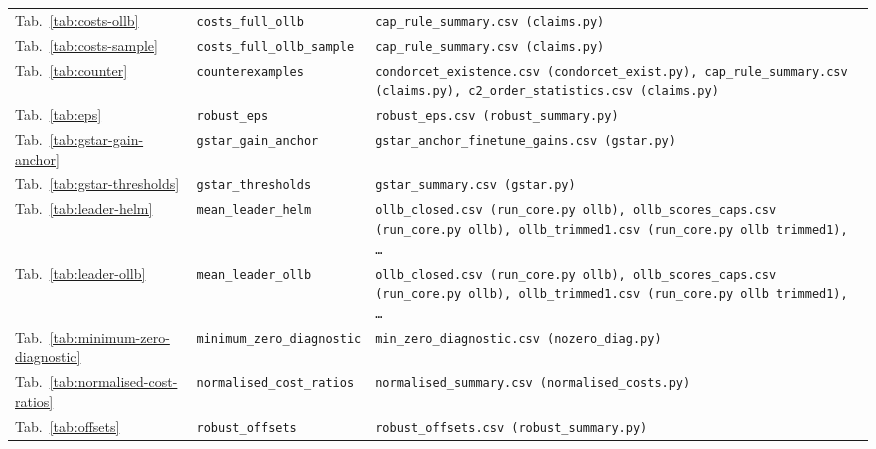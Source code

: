 \begin{longtable}{@{}p{0.55in} p{1.55in} p{3.0in}@{}}
Tab.~\ref{tab:costs-ollb} & \texttt{costs\_\allowbreak full\_\allowbreak ollb} & \texttt{cap\_\allowbreak rule\_\allowbreak summary.csv (claims.py)} \\
Tab.~\ref{tab:costs-sample} & \texttt{costs\_\allowbreak full\_\allowbreak ollb\_\allowbreak sample} & \texttt{cap\_\allowbreak rule\_\allowbreak summary.csv (claims.py)} \\
Tab.~\ref{tab:counter} & \texttt{counterexamples} & \texttt{condorcet\_\allowbreak existence.csv (condorcet\_\allowbreak exist.py), cap\_\allowbreak rule\_\allowbreak summary.csv (claims.py), c2\_\allowbreak order\_\allowbreak statistics.csv (claims.py)} \\
Tab.~\ref{tab:eps} & \texttt{robust\_\allowbreak eps} & \texttt{robust\_\allowbreak eps.csv (robust\_\allowbreak summary.py)} \\
Tab.~\ref{tab:gstar-gain-anchor} & \texttt{gstar\_\allowbreak gain\_\allowbreak anchor} & \texttt{gstar\_\allowbreak anchor\_\allowbreak finetune\_\allowbreak gains.csv (gstar.py)} \\
Tab.~\ref{tab:gstar-thresholds} & \texttt{gstar\_\allowbreak thresholds} & \texttt{gstar\_\allowbreak summary.csv (gstar.py)} \\
Tab.~\ref{tab:leader-helm} & \texttt{mean\_\allowbreak leader\_\allowbreak helm} & \texttt{ollb\_\allowbreak closed.csv (run\_\allowbreak core.py ollb), ollb\_\allowbreak scores\_\allowbreak caps.csv (run\_\allowbreak core.py ollb), ollb\_\allowbreak trimmed1.csv (run\_\allowbreak core.py ollb trimmed1), \ldots} \\
Tab.~\ref{tab:leader-ollb} & \texttt{mean\_\allowbreak leader\_\allowbreak ollb} & \texttt{ollb\_\allowbreak closed.csv (run\_\allowbreak core.py ollb), ollb\_\allowbreak scores\_\allowbreak caps.csv (run\_\allowbreak core.py ollb), ollb\_\allowbreak trimmed1.csv (run\_\allowbreak core.py ollb trimmed1), \ldots} \\
Tab.~\ref{tab:minimum-zero-diagnostic} & \texttt{minimum\_\allowbreak zero\_\allowbreak diagnostic} & \texttt{min\_\allowbreak zero\_\allowbreak diagnostic.csv (nozero\_\allowbreak diag.py)} \\
Tab.~\ref{tab:normalised-cost-ratios} & \texttt{normalised\_\allowbreak cost\_\allowbreak ratios} & \texttt{normalised\_\allowbreak summary.csv (normalised\_\allowbreak costs.py)} \\
Tab.~\ref{tab:offsets} & \texttt{robust\_\allowbreak offsets} & \texttt{robust\_\allowbreak offsets.csv (robust\_\allowbreak summary.py)} \\

\end{longtable}
